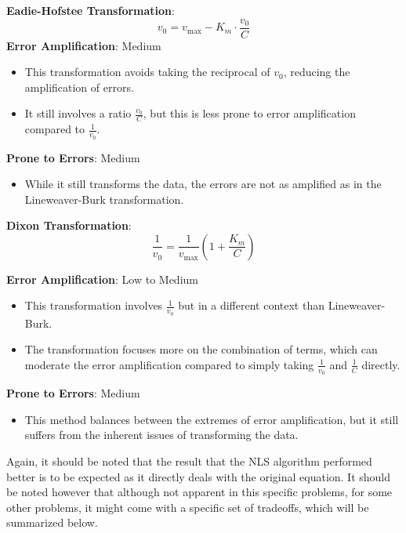 \documentclass{article} %
\theoremstyle{definition}
\theoremstyle{remark}
\theoremstyle{plain}
\begin{document}
\textbf{Eadie-Hofstee Transformation}:
\[
v_0 = v_{\max} - K_m \cdot \frac{v_0}{C}
\]
\textbf{Error Amplification}: Medium
\begin{itemize}[label={--}]
   \item This transformation avoids taking the reciprocal of \(v_0\), reducing the amplification of errors.
   \item It still involves a ratio \(\frac{v_0}{C}\), but this is less prone to error amplification compared to \(\frac{1}{v_0}\).
\end{itemize}
\textbf{Prone to Errors}: Medium
\begin{itemize}[label={--}]
   \item While it still transforms the data, the errors are not as amplified as in the Lineweaver-Burk transformation.
\end{itemize}\medbreak\medbreak\medbreak\medbreak

\textbf{Dixon Transformation}:
\[
\frac{1}{v_0} = \frac{1}{v_{\max}} \left(1 + \frac{K_m}{C}\right)
\]

\textbf{Error Amplification}: Low to Medium
\begin{itemize}[label={--}]
   \item This transformation involves \(\frac{1}{v_0}\) but in a different context than Lineweaver-Burk.
   \item The transformation focuses more on the combination of terms, which can moderate the error amplification compared to simply taking \(\frac{1}{v_0}\) and \(\frac{1}{C}\) directly.
\end{itemize}
\textbf{Prone to Errors}: Medium
\begin{itemize}[label={--}]
   \item This method balances between the extremes of error amplification, but it still suffers from the inherent issues of transforming the data.
\end{itemize}

Again, it should be noted that the result that the NLS algorithm performed better is to be expected as it directly deals with the original equation.
It should be noted however that although not apparent in this specific problems, for some other problems, it might come with a specific set of tradeoffs, which will be summarized below.\medbreak\medbreak\medbreak
\end{document}
